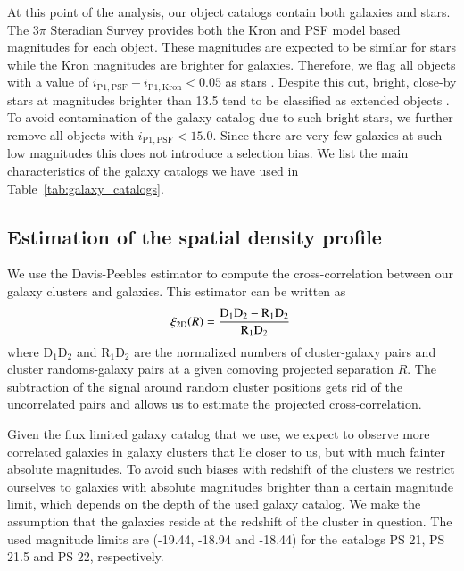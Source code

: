 \documentclass[iop, apjl, twocolappendix, numberedappendix]{emulateapj}
\begin{document}
At this point of the analysis, our object catalogs contain both
galaxies and stars. The 3$\pi$ Steradian Survey provides both the
Kron and PSF model based magnitudes for each object. These
magnitudes are expected to be similar for stars while the Kron
magnitudes are brighter for galaxies. Therefore, we flag all objects
with a value of $i_{\mathrm{P1,PSF}} - i_{\mathrm{P1,Kron}}< 0.05$
as stars \citep{farrow2013pan}. Despite this cut, bright, close-by
stars at magnitudes brighter than 13.5 tend to be classified as
extended objects \citep{chambers2016pan}. To avoid contamination of
the galaxy catalog due to such bright stars, we further remove all
objects with $i_{\mathrm{P1,PSF}} < 15.0$. Since there are very few
galaxies at such low magnitudes this does not introduce a selection
bias. We list the main characteristics of the galaxy catalogs we
have used in Table~\ref{tab:galaxy_catalogs}.

\subsection{Estimation of the spatial density profile}
\label{sec:estimators}

We use the Davis-Peebles estimator \citep{davis1983survey} to
compute the cross-correlation between our galaxy clusters and
galaxies. This estimator can be written as
\begin{equation}
\xi_{\rm 2D}(R) = \frac{\rm D_1D_2-R_1D_2}{\rm R_1D_2}\,
\end{equation}
where D$_1$D$_2$ and R$_1$D$_2$ are the normalized numbers of
cluster-galaxy pairs and cluster randoms-galaxy pairs at a given
comoving projected separation $R$. The subtraction of the signal
around random cluster positions gets rid of the uncorrelated pairs
and allows us to estimate the projected cross-correlation.

Given the flux limited galaxy catalog that we use, we expect to
observe more correlated galaxies in galaxy clusters that lie closer
to us, but with much fainter absolute magnitudes. To avoid
such biases with redshift of the clusters we restrict ourselves to
galaxies with absolute magnitudes brighter than a certain magnitude
limit, which depends on the depth of the used galaxy catalog. We
make the assumption that the galaxies reside at the redshift of the
cluster in question. The used magnitude limits are (-19.44, -18.94
and -18.44) for the catalogs PS 21, PS 21.5 and PS 22, respectively.
\end{document}
